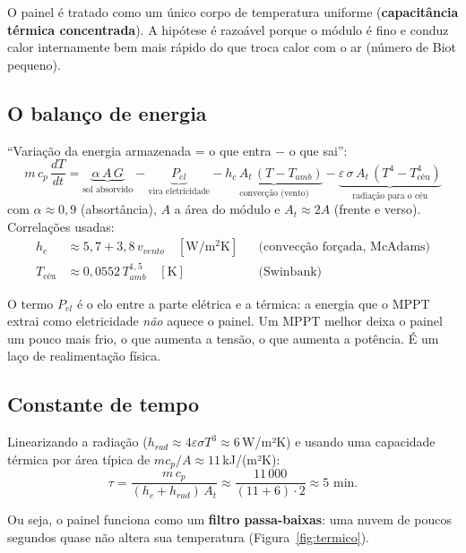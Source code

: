 \documentclass[11pt,a4paper]{article}
\begin{document}
O painel é tratado como um único corpo de temperatura uniforme (\textbf{capacitância térmica
concentrada}). A hipótese é razoável porque o módulo é fino e conduz calor internamente bem
mais rápido do que troca calor com o ar (número de Biot pequeno).

\subsection{O balanço de energia}

``Variação da energia armazenada = o que entra $-$ o que sai'':
\begin{equation}
m\,c_p\,\frac{dT}{dt} =
\underbrace{\alpha\,A\,G}_{\text{sol absorvido}}
-\underbrace{P_{el}}_{\text{vira eletricidade}}
-\underbrace{h_c\,A_t\,(T-T_{amb})}_{\text{convecção (vento)}}
-\underbrace{\varepsilon\,\sigma\,A_t\,(T^4-T_{\text{céu}}^4)}_{\text{radiação para o céu}}
\label{eq:termico}
\end{equation}
com $\alpha\approx0{,}9$ (absortância), $A$ a área do módulo e $A_t\approx2A$ (frente e verso).
Correlações usadas:
\begin{align}
h_c &\approx 5{,}7 + 3{,}8\,v_{vento}\quad[\mathrm{W/m^2K}] && \text{(convecção forçada, McAdams)}\\
T_{\text{céu}} &\approx 0{,}0552\,T_{amb}^{1{,}5}\quad[\mathrm K] && \text{(Swinbank)}
\end{align}

\begin{intuicao}[: o acoplamento]
O termo $P_{el}$ é o elo entre a parte elétrica e a térmica: a energia que o MPPT extrai
como eletricidade \emph{não} aquece o painel. Um MPPT melhor deixa o painel um pouco mais
frio, o que aumenta a tensão, o que aumenta a potência. É um laço de realimentação física.
\end{intuicao}

\subsection{Constante de tempo}

Linearizando a radiação ($h_{rad}\approx4\varepsilon\sigma T^3\approx6$\,W/m²K) e usando
uma capacidade térmica por área típica de $m c_p/A\approx11$\,kJ/(m²K):
\begin{equation}
\tau = \frac{m\,c_p}{(h_c+h_{rad})\,A_t}\approx\frac{11\,000}{(11+6)\cdot2}\approx 5\text{ min}.
\end{equation}

Ou seja, o painel funciona como um \textbf{filtro passa-baixas}: uma nuvem de poucos segundos
quase não altera sua temperatura (Figura~\ref{fig:termico}).
\end{document}

